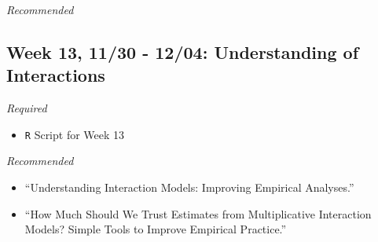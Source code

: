 \documentclass[11pt,]{article}
\providecommand{\tightlist}{%
  \setlength{\itemsep}{0pt}\setlength{\parskip}{0pt}}
\begin{document}
\emph{Recommended}

\hypertarget{week-13-1130---1204-understanding-of-interactions}{%
\subsection{Week 13, 11/30 - 12/04: Understanding of
Interactions}\label{week-13-1130---1204-understanding-of-interactions}}

\emph{Required}

\begin{itemize}
\tightlist
\item
  \texttt{R} Script for Week 13
\end{itemize}

\emph{Recommended}

\begin{itemize}
\item
  ``Understanding Interaction Models: Improving Empirical Analyses.''
\item
  ``How Much Should We Trust Estimates from Multiplicative Interaction
  Models? Simple Tools to Improve Empirical Practice.''
\end{itemize}
\end{document}
